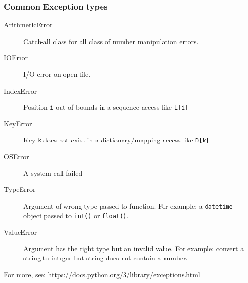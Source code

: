 \documentclass[english,serif,mathserif,xcolor=pdftex,dvipsnames,table]{beamer}
\begin{document}
\begin{frame}
  \frametitle{Common Exception types}
  \small

  \begin{description}
  \item[ArithmeticError] Catch-all class for all class of number manipulation errors. \\ %
  \item[IOError]             I/O error on open file. \\
  \item[IndexError]          Position \texttt{i} out of bounds in a sequence access like \texttt{L[i]} \\
  \item[KeyError]            Key \texttt{k} does not exist in a dictionary/mapping access like \texttt{D[k]}. \\
  \item[OSError]             A system call failed. \\
  \item[TypeError]           Argument of wrong type passed to function.  For example: a \texttt{datetime} object passed to \texttt{int()} or \texttt{float()}. \\
  \item[ValueError]          Argument has the right type but an invalid value.  For example: convert a string to integer but string does not contain a number. \\
  \end{description}

  For more, see: \url{https://docs.python.org/3/library/exceptions.html}
\end{frame}
\end{document}
